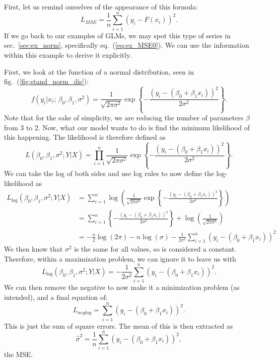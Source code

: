 \documentclass{article}
\begin{document}
 First, let us remind ourselves of the appearance of this formula:
 \begin{equation}
     L_{MSE} = \frac{1}{n}\sum_{i=1}^n(y_i - F(x_i))^2.
 \end{equation}
 If we go back to our examples of GLMs, we may spot this type of series in sec.~\ref{sec:ex_norm}, specifically eq.~(\ref{eq:ex_MSE0}). We can use the information within this example to derive it explicitly.
 
 First, we look at the function of a normal distribution, seen in fig.~(\ref{fig:stand_norm_dis}):
 \begin{equation}
     f(y_i\vert x_i;\,\beta_0,\beta_1,\sigma^2) = \frac{1}{\sqrt{2\pi\sigma^2}}\exp{\left\{ -\frac{(y_i-(\beta_0 + \beta_1 x_i))^2}{2\sigma^2} \right\}}.
 \end{equation}
 Note that for the sake of simplicity, we are reducing the number of parameters $\beta$ from $3$ to $2$. Now, what our model wants to do is find the minimum likelihood of this happening. The likelihood is therefore defined as
 \begin{equation}
     L(\beta_0,\beta_1,\sigma^2;Y\vert X) = \prod_{i=1}^n \frac{1}{\sqrt{2\pi\sigma^2}}\exp{\left\{ -\frac{(y_i-(\beta_0 + \beta_1 x_i))^2}{2\sigma^2} \right\}}.
 \end{equation}
We can take the log of both sides and use log rules to now define the log-likelihood as
\begin{align}
    L_{\log{}}(\beta_0,\beta_1,\sigma^2;Y\vert X) &= \sum_{i=1}^n  \log{\left( \frac{1}{\sqrt{2\pi\sigma^2}}\exp{\left\{ -\frac{(y_i-(\beta_0 + \beta_1 x_i))^2}{2\sigma^2} \right\}} \right)} \\
    &= \sum_{i=1}^n \left\{  -\frac{(y_i-(\beta_0 + \beta_1 x_i))^2}{2\sigma^2} \right\} + \log{\left( \frac{1}{\sqrt{2\pi\sigma^2}} \right)} \\
    &= -\frac{n}{2}\log{(2\pi)} - n\log{(\sigma)} - \frac{1}{2\sigma^2}\sum_{i=1}^n (y_i-(\beta_0 + \beta_1 x_i))^2
\end{align}
We then know that $\sigma^2$ is the same for all values, so is considered a constant. Therefore, within a maximization problem, we can ignore it to leave us with
\begin{equation}
     L_{\log{}}(\beta_0,\beta_1,\sigma^2;Y\vert X) = - \frac{1}{2\sigma^2}\sum_{i=1}^n (y_i-(\beta_0 + \beta_1 x_i))^2.
\end{equation}
We can then remove the negative to now make it a minimization problem (as intended), and a final equation of:
\begin{equation}
    L_{neglog} =  \sum_{i=1}^n (y_i-(\beta_0 + \beta_1 x_i))^2.
\end{equation}
This is just the sum of square errors. The mean of this is then extracted as
\begin{equation}
    \hat{\sigma}^2 = \frac{1}{n} \sum_{i=1}^n (y_i-(\beta_0 + \beta_1 x_i))^2,
\end{equation}
the MSE.

\nocite{2008APG}
\nocite{géron2019hands}
\nocite{GLM_basics}
\nocite{eng_stat}
\printbibliography
\end{document}
